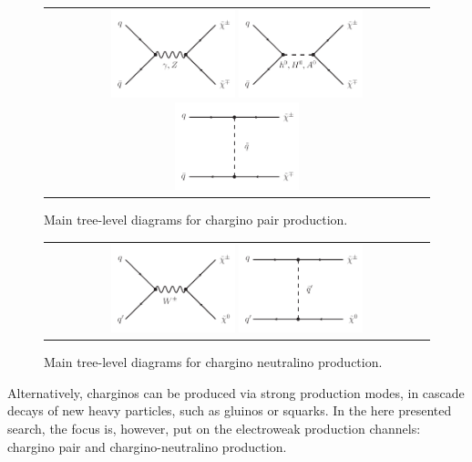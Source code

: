 \begin{figure}[!h]
  \centering 
  \begin{tabular}{c}
    \includegraphics[width=0.33\textwidth]{figures/analysis/ChiChi_GammaZ.pdf}
    \includegraphics[width=0.33\textwidth]{figures/analysis/ChiChi_Scalar.pdf}
    \includegraphics[width=0.33\textwidth]{figures/analysis/ChiChi_Squark.pdf}
  \end{tabular}
  \caption{Main tree-level diagrams for chargino pair production.}
  \label{fig:FeynmanDiagramProductionCharginoPair}
\end{figure}

\begin{figure}[!h]
  \centering 
  \begin{tabular}{c}
    \includegraphics[width=0.33\textwidth]{figures/analysis/ChiChi0_WBoson.pdf}
    \includegraphics[width=0.33\textwidth]{figures/analysis/ChiChi0_Squark.pdf}
  \end{tabular}
  \caption{Main tree-level diagrams for chargino neutralino production.}
  \label{fig:FeynmanDiagramProductionCharginoNeutralino}
\end{figure}
Alternatively, charginos can be produced via strong production modes, \ie in cascade decays of new heavy particles, such as gluinos or squarks.
In the here presented search, the focus is, however, put on the electroweak production channels: chargino pair and chargino-neutralino production.\\


